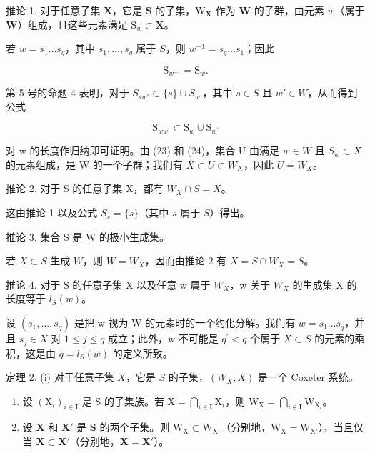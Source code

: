 推论 1. 对于任意子集 \(\mathbf{X}\)，它是 \(\mathbf{S}\) 的子集，\(\mathrm{W}_{\mathbf{X}}\) 作为 \(\mathbf{W}\) 的子群，由元素 \(w\)（属于 \(\mathbf{W}\)）组成，且这些元素满足 \(\mathrm{S}_w \subset \mathbf{X}\)。

若 \(w = s_1 \ldots s_q\)，其中 \(s_1, \ldots, s_q\) 属于 \(S\)，则 \(w^{-1} = s_q \ldots s_1\)；因此

\[
\mathrm{S} _ {w ^ {- 1}} = \mathrm{S} _ {w}.\tag{23}
\]

第 5 号的命题 4 表明，对于 \(S_{sw'} \subset \{s\} \cup S_{w'}\)，其中 \(s \in S\) 且 \(w' \in W\)，从而得到公式

\[
\mathrm{S} _ {w w ^ {\prime}} \subset \mathrm{S} _ {w} \cup \mathrm{S} _ {w ^ {\prime}}\tag{24}
\]

对 w 的长度作归纳即可证明。由 (23) 和 (24)，集合 U 由满足 \(w \in W\) 且 \(S_{w} \subset X\) 的元素组成，是 W 的一个子群；我们有 \(X \subset U \subset W_{X}\)，因此 \(U = W_{X}\)。

推论 2. 对于 S 的任意子集 X，都有 \(W_{X} \cap S = X\)。

这由推论 1 以及公式 \(S_s = \{s\}\)（其中 \(s\) 属于 \(S\)）得出。

推论 3. 集合 S 是 W 的极小生成集。

若 \(X \subset S\) 生成 \(W\)，则 \(W = W_X\)，因而由推论 2 有 \(X = S \cap W_X = S\)。

推论 4. 对于 S 的任意子集 X 以及任意 w 属于 \(W_{X}\)，w 关于 \(W_{X}\) 的生成集 X 的长度等于 \(l_{S}(w)\)。

设 \((s_{1},\ldots,s_{q})\) 是把 w 视为 W 的元素时的一个约化分解。我们有 \(w=s_{1}\ldots s_{q}\)，并且 \(s_{j}\in X\) 对 \(1\leqslant j\leqslant q\) 成立；此外，w 不可能是 \(q^{\prime}<q\) 个属于 \(X\subset S\) 的元素的乘积，这是由 \(q=l_{S}(w)\) 的定义所致。

定理 2. (i) 对于任意子集 \(X\)，它是 \(S\) 的子集，\((W_X, X)\) 是一个 Coxeter 系统。

\begin{enumerate}
\def\labelenumi{(\roman{enumi})}
\setcounter{enumi}{1}
\item
  设 \((\mathrm{X}_i)_{i\in \mathbf{I}}\) 是 S 的子集族。若 \(\mathrm{X} = \bigcap_{i\in \mathbf{I}}\mathrm{X}_i\)，则 \(\mathrm{W_X} = \bigcap_{i\in \mathbf{I}}\mathrm{W}_{\mathrm{X}_i}\)。
\item
  设 \(\mathbf{X}\) 和 \(\mathbf{X}'\) 是 \(\mathbf{S}\) 的两个子集。则 \(\mathrm{W_X} \subset \mathrm{W_{X'}}\)（分别地，\(\mathrm{W_X} = \mathrm{W_{X'}}\)），当且仅当 \(\mathbf{X} \subset \mathbf{X'}\)（分别地，\(\mathbf{X} = \mathbf{X'}\)）。
\end{enumerate}

